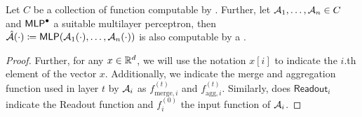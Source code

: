 \begin{lemma}\label{lem:composition_lemma_gnn}
    Let $C$ be a collection of function computable by \gnns. Further, let  $\mathcal{A}_1, \dots , \mathcal{A}_n \in C$ and $\textsf{MLP}^\bullet$ a suitable multilayer perceptron, then \\$\hat{\mathcal{A}}(\cdot) \coloneqq \textsf{MLP}(\mathcal{A}_1(\cdot), \dots, \mathcal{A}_n(\cdot))$ is also computable by a \gnn.
\end{lemma}

\begin{proof}
    Further, for any $x \in \mathbb{R}^d$, we will use the notation $x[i]$ to indicate the $i$.th element of the vector $x$. Additionally, we indicate the merge and aggregation function used in layer $t$ by $\mathcal{A}_i$ as $f^{(t)}_{\text{merge}, i}$ and $f^{(t)}_{\text{agg}, i}$. Similarly, does $\textsf{Readout}_i$ indicate the \textsf{Readout} function and $f^{(0)}_i$ the input function of $\mathcal{A}_i$.
    

\end{proof}

